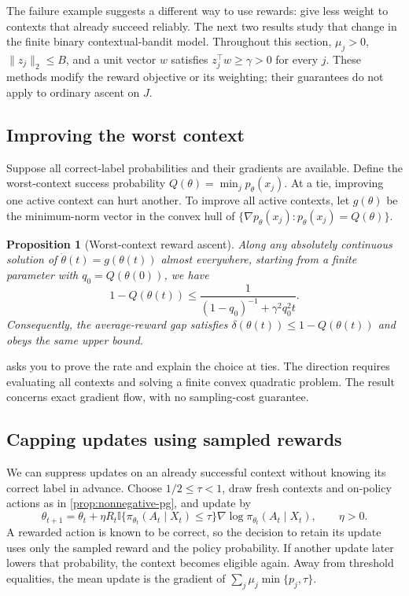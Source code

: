\documentclass[11pt,twoside]{article}
\newcommand{\I}{\mathbb I}
\newtheorem{proposition}[theorem]{Proposition}
\theoremstyle{definition}
\theoremstyle{remark}
\begin{document}
The failure example suggests a different way to use rewards: give less
weight to contexts that already succeed reliably. The next two results
study that change in the finite binary contextual-bandit model. Throughout
this section, $\mu_j>0$, $\|z_j\|_2\le B$, and a unit vector $w$
satisfies $z_j^\top w\ge\gamma>0$ for every $j$. These methods modify
the reward objective or its weighting; their guarantees do not apply to
ordinary ascent on $J$.

\subsection{Improving the worst context}

Suppose all correct-label probabilities and their gradients are available.
Define the worst-context success probability
$Q(\theta)=\min_jp_\theta(x_j)$. At a tie, improving one active context
can hurt another. To improve all active contexts, let $g(\theta)$ be the
minimum-norm vector in the convex hull of
$\{\nabla p_\theta(x_j):p_\theta(x_j)=Q(\theta)\}$.

\begin{proposition}[Worst-context reward ascent]
\label{prop:worst-context}
Along any absolutely continuous solution of
$\dot\theta(t)=g(\theta(t))$ almost everywhere, starting from a finite
parameter with $q_0=Q(\theta(0))$, we have
\[
 1-Q(\theta(t))\le
 \frac{1}{(1-q_0)^{-1}+\gamma^2q_0^2t}.
\]
Consequently, the average-reward gap satisfies
$\delta(\theta(t))\le1-Q(\theta(t))$ and obeys the same upper bound.
\end{proposition}

 asks you to prove the rate and explain the
choice at ties. The direction requires evaluating all contexts and
solving a finite convex quadratic problem. The result concerns exact
gradient flow, with no sampling-cost guarantee.

\subsection{Capping updates using sampled rewards}

We can suppress updates on an already successful context without knowing
its correct label in advance. Choose $1/2\le\tau<1$, draw fresh contexts
and on-policy actions as in \cref{prop:nonnegative-pg}, and update by
\begin{equation}
 \theta_{t+1}=\theta_t+\eta R_t
 \I\{\pi_{\theta_t}(A_t\mid X_t)\le\tau\}
 \nabla\log\pi_{\theta_t}(A_t\mid X_t),\qquad\eta>0.
 \label{eq:capped-update}
\end{equation}
A rewarded action is known to be correct, so the decision to retain its
update uses only the sampled reward and the policy probability.
If another update later lowers that probability, the context becomes
eligible again. Away from threshold equalities, the mean update is the
gradient of $\sum_j\mu_j\min\{p_j,\tau\}$.
\end{document}
